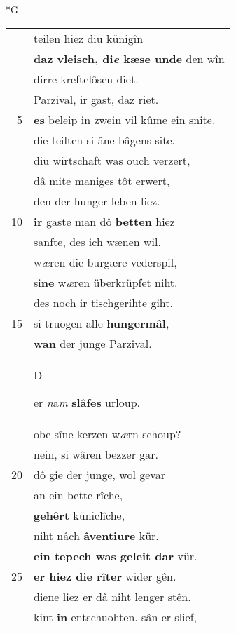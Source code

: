 \documentclass[8pt,a4paper,notitlepage]{article}
\begin{document}
\begin{table}[ht]
\begin{minipage}[t]{0.5\linewidth}
\small
\begin{center}*G
\end{center}
\begin{tabular}{rl}
 & teilen hiez diu künigîn\\ 
 & \textbf{daz vleisch, di\textit{e} kæse unde} den wîn\\ 
 & dirre kreftelôsen diet.\\ 
 & Parzival, ir gast, daz riet.\\ 
5 & \textbf{es} beleip in zwein vil kûme ein snite.\\ 
 & die teilten si âne bâgens site.\\ 
 & diu wirtschaft was ouch verzert,\\ 
 & dâ mite maniges tôt erwert,\\ 
 & den der hunger leben liez.\\ 
10 & \textbf{ir} gaste man dô \textbf{betten} hiez\\ 
 & sanfte, des ich wænen wil.\\ 
 & w\textit{æ}ren die burgære vederspil,\\ 
 & si\textbf{ne} w\textit{æ}ren überkrüpfet niht.\\ 
 & des noch ir tischgerihte giht.\\ 
15 & si truogen alle \textbf{hungermâl},\\ 
 & \textbf{wan} der junge Parzival.\\ 
 & \begin{large}D\end{large}er \textit{n}a\textit{m} \textbf{slâfes} urloup.\\ 
 & obe sîne kerzen w\textit{æ}rn schoup?\\ 
 & nein, si wâren bezzer gar.\\ 
20 & dô gie der junge, wol gevar\\ 
 & an ein bette rîche,\\ 
 & \textbf{gehêrt} küniclîche,\\ 
 & niht nâch \textbf{âventiure} kür.\\ 
 & \textbf{ein tepech was geleit dar} vür.\\ 
25 & \textbf{er hiez die rîter} wider gên.\\ 
 & diene liez er dâ niht lenger stên.\\ 
 & kint \textbf{in} entschuohten. sân er slief,\\ 

\end{tabular}
\end{minipage}
\end{table}
\end{document}
